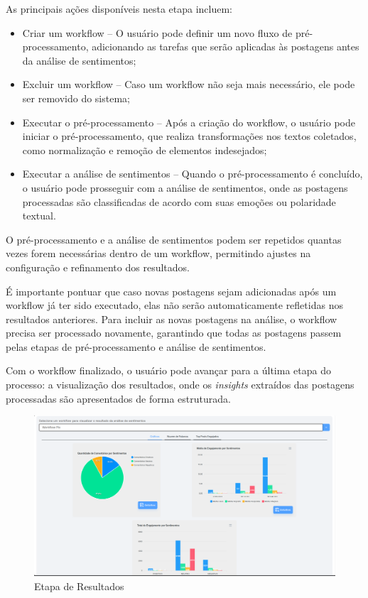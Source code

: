 \documentclass[
	12pt,				%
	oneside,			%
	a4paper,			%
	english,			%
	french,				%
	spanish,			%
	brazil				%
	]{abntex2}
\begin{document}
As principais ações disponíveis nesta etapa incluem:

\begin{itemize}
\tightlist
\item
  Criar um workflow -- O usuário pode definir um novo fluxo de
  pré-processamento, adicionando as tarefas que serão aplicadas às
  postagens antes da análise de sentimentos;
\item
  Excluir um workflow -- Caso um workflow não seja mais necessário, ele
  pode ser removido do sistema;
\item
  Executar o pré-processamento -- Após a criação do workflow, o usuário
  pode iniciar o pré-processamento, que realiza transformações nos
  textos coletados, como normalização e remoção de elementos
  indesejados;
\item
  Executar a análise de sentimentos -- Quando o pré-processamento é
  concluído, o usuário pode prosseguir com a análise de sentimentos,
  onde as postagens processadas são classificadas de acordo com suas
  emoções ou polaridade textual.
\end{itemize}

O pré-processamento e a análise de sentimentos podem ser repetidos
quantas vezes forem necessárias dentro de um workflow, permitindo
ajustes na configuração e refinamento dos resultados.

É importante pontuar que caso novas postagens sejam adicionadas após um
workflow já ter sido executado, elas não serão automaticamente
refletidas nos resultados anteriores. Para incluir as novas postagens na
análise, o workflow precisa ser processado novamente, garantindo que
todas as postagens passem pelas etapas de pré-processamento e análise de
sentimentos.

Com o workflow finalizado, o usuário pode avançar para a última etapa do
processo: a visualização dos resultados, onde os \emph{insights}
extraídos das postagens processadas são apresentados de forma
estruturada.

\begin{figure}[htbp]
\hypertarget{etapa_resultados}{%
\caption{Etapa de Resultados}\label{etapa_resultados}
\begin{center}
\includegraphics[scale=0.2]{imagens/sentilytics/interface-grafica/resultado-graficos.png}
\end{center}
}
\end{figure}
\end{document}
